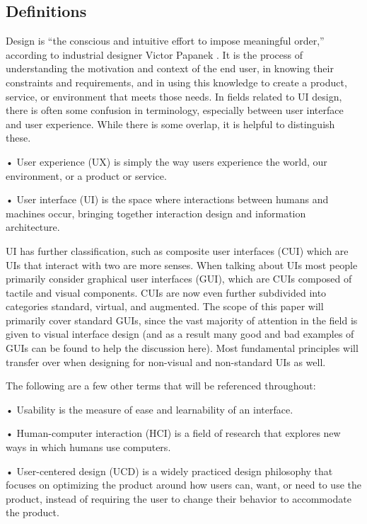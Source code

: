 \documentclass[12pt, oneside]{article}
\begin{document}
\subsection{Definitions}

Design is ``the conscious and intuitive effort to impose meaningful order,'' according to industrial designer Victor Papanek \cite[p.~12]{cooper_reimann_cronin_2014}. It is the process of understanding the motivation and context of the end user, in knowing their constraints and requirements, and in using this knowledge to create a product, service, or environment that meets those needs. In fields related to UI design, there is often some confusion in terminology, especially between user interface and user experience. While there is some overlap, it is helpful to distinguish these.

• User experience (UX) is simply the way users experience the world, our environment, or a product or service.

• User interface (UI) is the space where interactions between humans and machines occur, bringing together interaction design and information architecture.

UI has further classification, such as composite user interfaces (CUI) which are UIs that interact with two are more senses. When talking about UIs most people primarily consider graphical user interfaces (GUI), which are CUIs composed of tactile and visual components. CUIs are now even further subdivided into categories standard, virtual, and augmented. The scope of this paper will primarily cover standard GUIs, since the vast majority of attention in the field is given to visual interface design (and as a result many good and bad examples of GUIs can be found to help the discussion here). Most fundamental principles will transfer over when designing for non-visual and non-standard UIs as well.

The following are a few other terms that will be referenced throughout:

• Usability is the measure of ease and learnability of an interface.

• Human-computer interaction (HCI) is a field of research that explores new ways in
which humans use computers.

• User-centered design (UCD) is a widely practiced design philosophy that focuses on
optimizing the product around how users can, want, or need to use the product, instead of requiring the user to change their behavior to accommodate the product.
\end{document}
